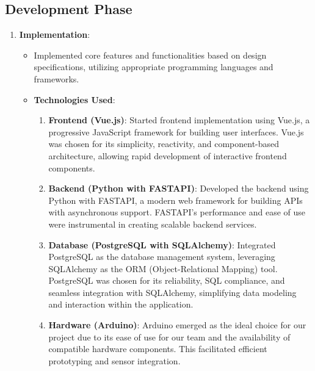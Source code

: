 \subsection{Development Phase}

\begin{enumerate}

    \item \textbf{Implementation}:
    \begin{itemize}
        \item Implemented core features and functionalities based on design specifications, utilizing appropriate programming languages and frameworks.
        \item \textbf{Technologies Used}:
            \begin{enumerate}
                \item \textbf{Frontend (Vue.js)}: Started frontend implementation using Vue.js, a progressive JavaScript framework for building user interfaces. Vue.js was chosen for its simplicity, reactivity, and component-based architecture, allowing rapid development of interactive frontend components.
                \item \textbf{Backend (Python with FASTAPI)}: Developed the backend using Python with FASTAPI, a modern web framework for building APIs with asynchronous support. FASTAPI's performance and ease of use were instrumental in creating scalable backend services.
                \item \textbf{Database (PostgreSQL with SQLAlchemy)}: Integrated PostgreSQL as the database management system, leveraging SQLAlchemy as the ORM (Object-Relational Mapping) tool. PostgreSQL was chosen for its reliability, SQL compliance, and seamless integration with SQLAlchemy, simplifying data modeling and interaction within the application.
                \item \textbf{Hardware (Arduino)}: Arduino emerged as the ideal choice for our project due to its ease of use for our team and the availability of compatible hardware components. This facilitated efficient prototyping and sensor integration.
            \end{enumerate}
    \end{itemize}



\end{enumerate}
